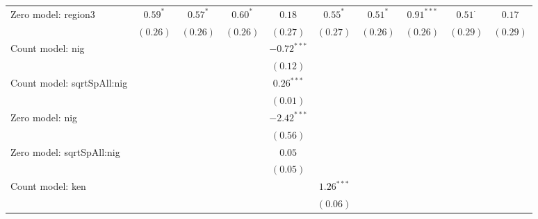 \begin{table}
\begin{center}
{\begin{tabular}{l c c c c c c c c c}
Zero model: region3            & $0.59^{*}$    & $0.57^{*}$    & $0.60^{*}$    & $0.18$        & $0.55^{*}$      & $0.51^{*}$      & $0.91^{***}$  & $0.51^{\cdot}$ & $0.17$        \\
                               & $(0.26)$      & $(0.26)$      & $(0.26)$      & $(0.27)$      & $(0.27)$        & $(0.26)$        & $(0.26)$      & $(0.29)$       & $(0.29)$      \\
Count model: nig               &               &               &               & $-0.72^{***}$ &                 &                 &               &                &               \\
                               &               &               &               & $(0.12)$      &                 &                 &               &                &               \\
Count model: sqrtSpAll:nig     &               &               &               & $0.26^{***}$  &                 &                 &               &                &               \\
                               &               &               &               & $(0.01)$      &                 &                 &               &                &               \\
Zero model: nig                &               &               &               & $-2.42^{***}$ &                 &                 &               &                &               \\
                               &               &               &               & $(0.56)$      &                 &                 &               &                &               \\
Zero model: sqrtSpAll:nig      &               &               &               & $0.05$        &                 &                 &               &                &               \\
                               &               &               &               & $(0.05)$      &                 &                 &               &                &               \\
Count model: ken               &               &               &               &               & $1.26^{***}$    &                 &               &                &               \\
                               &               &               &               &               & $(0.06)$        &                 &               &                &               \\

\end{tabular}}
\end{center}
\end{table}

